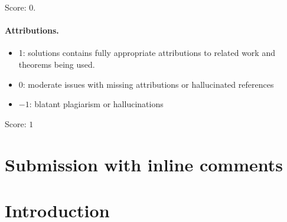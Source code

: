 \documentclass[11pt]{article}
\theoremstyle{definition}
\theoremstyle{remark}
\begin{document}
\noindent Score: $0$. 

\paragraph{Attributions.}
\begin{itemize}
	\item  1: solutions contains fully appropriate attributions
		to related work and theorems being used.
	\item  0: moderate issues with missing attributions or hallucinated references
	\item  $-1$: blatant plagiarism or hallucinations
\end{itemize}

\noindent Score: $1$

\newpage
\section{Submission with inline comments}


\begin{abstract}
An \(L\)-space knot is a knot in \(S^3\) with a non-trivial Dehn surgery
whose Heegaard Floer homology is as small as its first homology allows.
We show that every Dehn surgery on an \(L\)-space knot has at most two
non-trivial prime summands. The proof combines published results on
reducible surgeries (\(L\)-space knots are fibered, by Ni; a reducible
surgery on a hyperbolic knot with a positive \(L\)-space surgery has slope
\(2g-1\), by Hom--Lidman--Zufelt; the Cabling Conjecture holds for
non-trivial non-hyperbolic knots, by Moser and Scharlemann; Gordon's
formula for
surgery on a cable; the Gordon--Luecke theorem on non-integral surgeries)
with an elementary group-theoretic obstruction: if a \(p/q\)-surgery on a
fibered knot of genus \(g\) has a non-trivial integer homology sphere
summand, then \(|p|\le g\). The obstruction is proved by estimating the
minimal number of generators of the commutator subgroup of the
fundamental group in two ways, through the universal abelian cover and
Grushko's theorem on free products on one side and through the
fundamental group of the fiber surface on the other.
\end{abstract}

\section{Introduction}\label{sec:intro}
\end{document}

